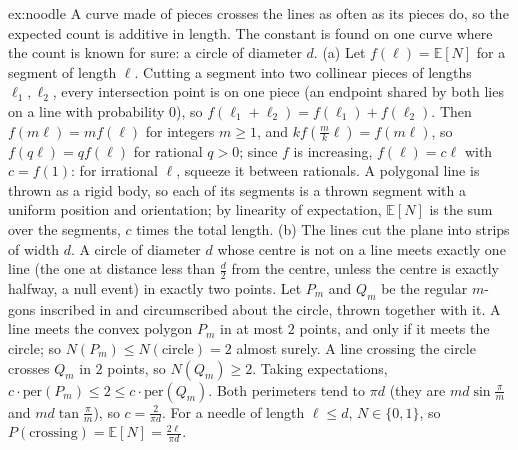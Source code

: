 \begin{solution}{ex:noodle}
\idea A curve made of pieces crosses the lines as often as its pieces do, so the expected count is additive in
length. The constant is found on one curve where the count is known for sure: a circle of diameter $d$.
\writeup (a) Let $f(\ell)=\mathbb E[N]$ for a segment of length $\ell$. Cutting a segment into two collinear pieces
of lengths $\ell_1,\ell_2$, every intersection point is on one piece (an endpoint shared by both lies on a line with
probability $0$), so $f(\ell_1+\ell_2)=f(\ell_1)+f(\ell_2)$. Then $f(m\ell)=mf(\ell)$ for integers $m\ge1$, and $kf(\frac mk\ell)=f(m\ell)$, so $f(q\ell)=qf(\ell)$ for rational $q>0$; since $f$ is increasing, $f(\ell)=c\ell$ with $c=f(1)$: for irrational $\ell$,
squeeze it between rationals. A polygonal line is thrown as a rigid body, so each of its segments is a thrown
segment with a uniform position and orientation; by linearity of expectation, $\mathbb E[N]$ is the sum over
the segments, $c$ times the total length.
(b) The lines cut the plane into strips of width $d$. A circle of diameter $d$ whose centre is not on a line
meets exactly one line (the one at distance less than $\frac d2$ from the centre, unless the centre is exactly
halfway, a null event) in exactly two points. Let $P_m$ and $Q_m$ be the regular $m$-gons inscribed in and
circumscribed about the circle, thrown together with it. A line meets the convex polygon $P_m$ in at most $2$
points, and only if it meets the circle; so $N(P_m)\le N(\text{circle})=2$ almost surely. A line crossing the
circle crosses $Q_m$ in $2$ points, so $N(Q_m)\ge2$. Taking expectations, $c\cdot\text{per}(P_m)\le2\le c\cdot\text{per}(Q_m)$.
Both perimeters tend to $\pi d$ (they are $md\sin\frac\pi m$ and $md\tan\frac\pi m$), so $c=\frac2{\pi d}$. For a needle of
length $\ell\le d$, $N\in\{0,1\}$, so $P(\text{crossing})=\mathbb E[N]=\frac{2\ell}{\pi d}$.
\end{solution}

